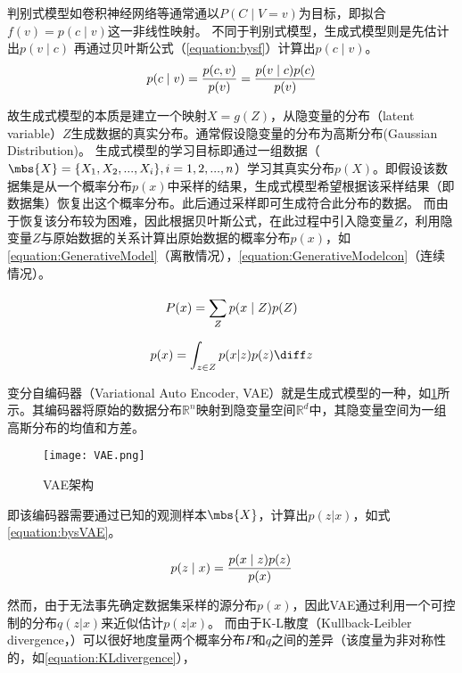 判别式模型如卷积神经网络等通常通以$P(C \mid V=v)$为目标，即拟合$f(v) = p(c \mid v)$这一非线性映射。
不同于判别式模型，生成式模型则是先估计出$p(v \mid c)$ 再通过贝叶斯公式（\cref{equation:bysf}）计算出$p(c \mid v)$。
\begin{equation}
  \centering
  \label{equation:bysf}
  p(c \mid v) = \frac{p(c, v)}{p(v)} = \frac{p(v \mid c)p(c)}{p(v)} 
\end{equation}

故生成式模型的本质是建立一个映射$X=g(Z)$，从隐变量的分布（latent variable）$Z$生成数据的真实分布。通常假设隐变量的分布为高斯分布(Gaussian Distribution)。
生成式模型的学习目标即通过一组数据（$\mbs{X} = \{X_1, X_2, ..., X_i\}, i = 1, 2, ..., n$）学习其真实分布$p(X)$。即假设该数据集是从一个概率分布$p(x)$中采样的结果，生成式模型希望根据该采样结果（即数据集）恢复出这个概率分布。此后通过采样即可生成符合此分布的数据。
而由于恢复该分布较为困难，因此根据贝叶斯公式，在此过程中引入隐变量$Z$，利用隐变量$Z$与原始数据的关系计算出原始数据的概率分布$p(x)$，如\cref{equation:GenerativeModel}（离散情况），\cref{equation:GenerativeModelcon}（连续情况）。

\begin{equation}
  \centering
  \label{equation:GenerativeModel}
  P(x) = \sum_{Z}^{}p(x\mid Z)p(Z)
\end{equation}

\begin{equation}
  \centering
  \label{equation:GenerativeModelcon}
  p(x) = \int_{z \in Z}^{} p(x|z)p(z)\diff z
\end{equation}

变分自编码器（Variational Auto Encoder, VAE）就是生成式模型的一种，如\cref{figure:VAE}所示。其编码器将原始的数据分布$\mathbb{R}^n$映射到隐变量空间$\mathbb{R}^d$中，其隐变量空间为一组高斯分布的均值和方差。
\begin{figure}[h]
  \centering
  \texttt{[image: VAE.png]}
  \caption{VAE架构}
  \label{figure:VAE}
  \end{figure}

即该编码器需要通过已知的观测样本$\mbs{X}$，计算出$p(z|x)$，如式\cref{equation:bysVAE}。

\begin{equation}
  \centering
  \label{equation:bysVAE}
  p(z \mid x) = \frac{p(x \mid z)p(z)}{p(x)} 
\end{equation}

然而，由于无法事先确定数据集采样的源分布$p(x)$，因此VAE通过利用一个可控制的分布$q(z|x)$来近似估计$p(z|x)$。
而由于K-L散度（Kullback-Leibler divergence，）可以很好地度量两个概率分布$P$和$q$之间的差异（该度量为非对称性的，如\cref{equation:KLdivergence}），

